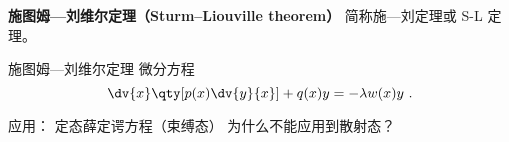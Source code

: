 
\begin{issues}
\issueDraft
\end{issues}


\textbf{施图姆—刘维尔定理（Sturm–Liouville theorem）} 简称施—刘定理或 S-L 定理。

\begin{theorem}{施图姆—刘维尔定理}
微分方程
\begin{equation}
\dv{x}\qty[p(x)\dv{y}{x}] + q(x) y = -\lambda w(x) y~.
\end{equation}
\end{theorem}

应用： 定态薛定谔方程（束缚态） 为什么不能应用到散射态？
